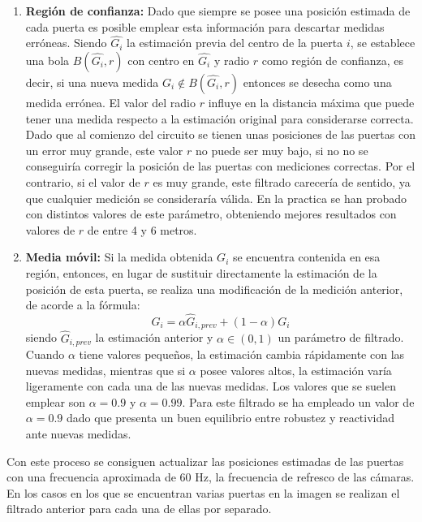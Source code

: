 \begin{enumerate}
	\item \textbf{Región de confianza:} Dado que siempre se posee una posición estimada de cada puerta es posible emplear esta información para descartar medidas erróneas. Siendo $\hat{G_i}$ la estimación previa del centro de la puerta $i$, se establece una bola $B(\hat{G_i},r)$ con centro en $\hat{G_i}$  y radio $r$ como región de confianza, es decir, si una nueva medida $G_i \notin B(\hat{G_i},r)$ entonces se desecha como una medida errónea.
	El valor del radio $r$ influye en la distancia máxima que puede tener una medida respecto a la estimación original para considerarse correcta. Dado que al comienzo del circuito se tienen unas posiciones de las puertas con un error muy grande, este valor $r$ no puede ser muy bajo, si no no se conseguiría corregir la posición de las puertas con mediciones correctas. Por el contrario, si el valor de $r$ es muy grande, este filtrado carecería de sentido, ya que cualquier medición se consideraría válida. En la practica se han probado con distintos valores de este parámetro, obteniendo mejores resultados con valores de $r$ de entre 4 y 6 metros.
	\item \textbf{Media móvil:} Si la medida obtenida $G_i$ se encuentra contenida en esa región, entonces, en lugar de sustituir directamente la estimación de la posición de esta puerta, se realiza una modificación de la medición anterior, de acorde a la fórmula:
	\begin{equation}
		\hat{G_i} = \alpha \hat{G}_{i,prev} + (1-\alpha)G_i
	\end{equation}
	siendo $\hat{G}_{i,prev}$ la estimación anterior y $\alpha \in (0,1)$ un parámetro de filtrado. Cuando $\alpha$ tiene valores pequeños, la estimación cambia rápidamente con las nuevas medidas, mientras que si $\alpha$ posee valores altos, la estimación varía ligeramente con cada una de las nuevas medidas. Los valores que se suelen emplear son $\alpha = 0.9$ y $\alpha = 0.99$. Para este filtrado se ha empleado un valor de $\alpha = 0.9$ dado que presenta un buen equilibrio entre robustez y reactividad ante nuevas medidas.

\end{enumerate}


Con este proceso se consiguen actualizar las posiciones estimadas de las puertas con una frecuencia aproximada de 60 Hz, la frecuencia de refresco de las cámaras. En los casos en los que se encuentran varias puertas en la imagen se realizan el filtrado anterior para cada una de ellas por separado.

